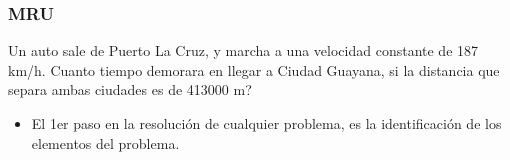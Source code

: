 \documentclass{beamer}
\begin{document}
\begin{frame}
\frametitle{MRU}
% 
 
Un {{ auto}} sale de Puerto La Cruz, y marcha a una
velocidad constante de 187 km/h. Cuanto tiempo
demorara en llegar a Ciudad Guayana, si la distancia que
separa ambas ciudades es de 413000 m?                                                         
                                                              
 
\begin{itemize}                                                              

\item El 1er paso en la resoluci\'on de cualquier problema, es la
identificaci\'on de los elementos del problema.            
              
\end{itemize}                                                 
 
 
\scalebox{1} %
{
}

\end{frame}
\end{document}
